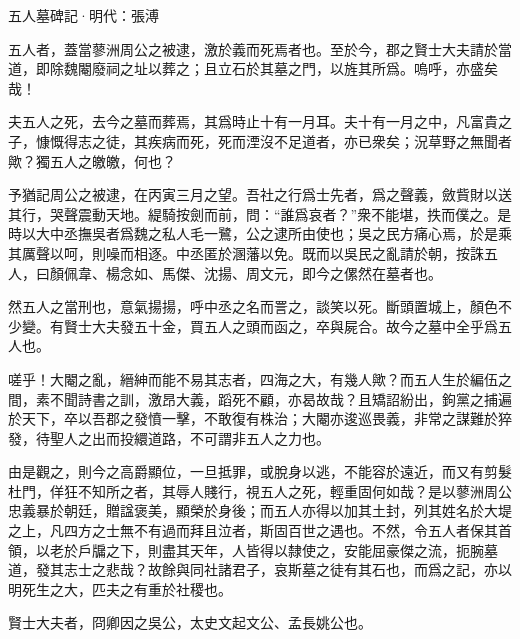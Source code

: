 \documentclass[12pt,a4paper]{ctexbook}
\begin{document}
五人墓碑記·明代：張溥 \par
五人者，蓋當蓼洲周公之被逮，激於義而死焉者也。至於今，郡之賢士大夫請於當道，即除魏閹廢祠之址以葬之；且立石於其墓之門，以旌其所爲。嗚呼，亦盛矣哉！\par
夫五人之死，去今之墓而葬焉，其爲時止十有一月耳。夫十有一月之中，凡富貴之子，慷慨得志之徒，其疾病而死，死而湮沒不足道者，亦已衆矣；況草野之無聞者歟？獨五人之皦皦，何也？\par
予猶記周公之被逮，在丙寅三月之望。吾社之行爲士先者，爲之聲義，斂貲財以送其行，哭聲震動天地。緹騎按劍而前，問：“誰爲哀者？”衆不能堪，抶而僕之。是時以大中丞撫吳者爲魏之私人毛一鷺，公之逮所由使也；吳之民方痛心焉，於是乘其厲聲以呵，則噪而相逐。中丞匿於溷藩以免。既而以吳民之亂請於朝，按誅五人，曰顏佩韋、楊念如、馬傑、沈揚、周文元，即今之傫然在墓者也。\par
然五人之當刑也，意氣揚揚，呼中丞之名而詈之，談笑以死。斷頭置城上，顏色不少變。有賢士大夫發五十金，買五人之頭而函之，卒與屍合。故今之墓中全乎爲五人也。\par
嗟乎！大閹之亂，縉紳而能不易其志者，四海之大，有幾人歟？而五人生於編伍之間，素不聞詩書之訓，激昂大義，蹈死不顧，亦曷故哉？且矯詔紛出，鉤黨之捕遍於天下，卒以吾郡之發憤一擊，不敢復有株治；大閹亦逡巡畏義，非常之謀難於猝發，待聖人之出而投繯道路，不可謂非五人之力也。\par
由是觀之，則今之高爵顯位，一旦抵罪，或脫身以逃，不能容於遠近，而又有剪髮杜門，佯狂不知所之者，其辱人賤行，視五人之死，輕重固何如哉？是以蓼洲周公忠義暴於朝廷，贈諡褒美，顯榮於身後；而五人亦得以加其土封，列其姓名於大堤之上，凡四方之士無不有過而拜且泣者，斯固百世之遇也。不然，令五人者保其首領，以老於戶牖之下，則盡其天年，人皆得以隸使之，安能屈豪傑之流，扼腕墓道，發其志士之悲哉？故餘與同社諸君子，哀斯墓之徒有其石也，而爲之記，亦以明死生之大，匹夫之有重於社稷也。\par
賢士大夫者，冏卿因之吳公，太史文起文公、孟長姚公也。\par
\end{document}

